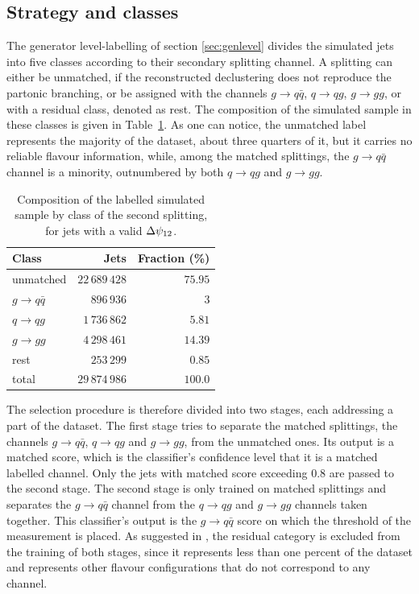 \subsection{Strategy and classes}
\label{sec:flavour-strategy}

The generator level-labelling of section \ref{sec:genlevel} divides the simulated jets
into five classes according to their secondary splitting channel. A splitting can either be unmatched,
if the reconstructed declustering does not reproduce the partonic
branching, or be assigned with the channels $g \to q\bar{q}$, $q \to qg$, $g \to gg$, or with a residual class, denoted as rest.
The composition of the simulated sample in these classes is given in
Table~\ref{tab:composition}. As one can notice, the unmatched label represents the 
majority of the dataset, about three quarters of it, but it carries no reliable flavour
information, while, among the matched splittings, the $g \to q\bar{q}$ channel is a minority,
outnumbered by both $q \to qg$ and $g \to gg$.

\begin{table}[htbp]
  \centering
  \caption{Composition of the labelled simulated sample by class of the second
  splitting, for jets with a valid $\Delta\psi_{12}$.}
  \label{tab:composition}
  \begin{tabular}{lrr}
    \toprule
    Class & Jets & Fraction (\%) \\
    \midrule
    unmatched          & $22\,689\,428$ & $75.95$ \\
    $g \to q\bar{q}$   & $896\,936$    & $3$ \\
    $q \to qg$         & $1\,736\,862$    & $5.81$ \\
    $g \to gg$         & $4\,298\,461$    & $14.39$ \\
    rest               & $253\,299$     & $0.85$ \\
    \midrule
    total              & $29\,874\,986$ & $100.0$ \\
    \bottomrule
  \end{tabular}
\end{table}

The selection procedure is therefore divided into two stages, each addressing a part of the dataset.
The first stage tries to separate the matched splittings, the channels
$g \to q\bar{q}$, $q \to qg$ and $g \to gg$, from the unmatched ones. Its output is a matched score,
which is the classifier's confidence level that it is a matched labelled channel. Only the 
jets with matched score exceeding $0.8$ are passed to the
second stage. The second stage is only trained on matched splittings and separates the $g \to q\bar{q}$ channel from the $q \to qg$ and $g \to gg$ channels
taken together. This classifier's output is the $g \to q\bar{q}$ score on which the threshold of
the measurement is placed. As suggested in \cite{CMS:2026jnt}, the residual category is 
excluded from the training of both stages, since it represents less than one percent of the dataset
and represents other flavour configurations that do not correspond to any channel.

